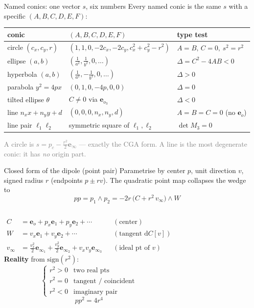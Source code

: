 \documentclass[aspectratio=169, 10pt]{beamer}
\newcommand{\eo}{\mathbf{e}_o}
\newcommand{\einff}{\mathbf{e}_\infty}
\newcommand{\eoi}[1]{\mathbf{e}_{o_{#1}}}
\newcommand{\einfi}[1]{\mathbf{e}_{\infty_{#1}}}
\newcommand{\wed}{\wedge}
\newcommand{\vinf}{v_\infty}
\newcommand{\pca}{p_c}
\begin{document}
\begin{frame}[t]{Named conics: one vector $s$, six numbers}
  Every named conic is the same $s$ with a specific $(A,B,C,D,E,F)$:
  \vspace{0.2cm}
  \begin{center}
  \renewcommand{\arraystretch}{1.3}
  \small
  \begin{tabular}{l l l}
    conic & $(A,B,C,D,E,F)$ & type test\\
    \hline
    \alert{circle} $(c_x,c_y,r)$ & $(1,1,0,-2c_x,-2c_y,c_x^2{+}c_y^2{-}r^2)$ & $A{=}B,\,C{=}0,\ s^2{=}r^2$\\
    \alert{ellipse} $(a,b)$ & $(\tfrac1{a^2},\tfrac1{b^2},0,\dots)$ & $\Delta=C^2{-}4AB<0$\\
    \alert{hyperbola} $(a,b)$ & $(\tfrac1{a^2},-\tfrac1{b^2},0,\dots)$ & $\Delta>0$\\
    \alert{parabola} $y^2{=}4px$ & $(0,1,0,-4p,0,0)$ & $\Delta=0$\\
    \alert{tilted ellipse} $\theta$ & $C\neq0$ via $\eoi3$ & $\Delta<0$\\
    \alert{line} $n_xx{+}n_yy{+}d$ & $(0,0,0,n_x,n_y,d)$ & $A{=}B{=}C{=}0$ (no $\eo$)\\
    \alert{line pair} $\ell_1\ell_2$ & symmetric square of $\ell_1,\ell_2$ & $\det M_3=0$\\
  \end{tabular}
  \end{center}
  \vspace{0.2cm}
  \textcolor{gray}{A circle is $s=\pca-\tfrac{r^2}2\einff$ --- exactly the CGA form. A line is the most degenerate conic: it has \emph{no} origin part.}
\end{frame}

\begin{frame}[t]{Closed form of the dipole (point pair)}
  Parametrise by center $p$, unit direction $v$, signed radius $r$
  (endpoints $p\pm r v$). The quadratic point map collapses the wedge to
  \[
    \boxed{\;
      pp = p_1\wed p_2 = -2r\,\big(C + r^2\,\vinf\big)\wed W
    \;}
  \]
  \vspace{-0.2cm}
  \begin{columns}[T]
      \small
      \begin{align*}
        C       &= \eo + p_x\mathbf{e}_1 + p_y\mathbf{e}_2 + \cdots && (\text{center})\\
        W       &= v_x\mathbf{e}_1 + v_y\mathbf{e}_2 + \cdots && (\text{tangent }\mathrm dC[v])\\
        \vinf   &= \tfrac{v_x^2}2\einfi1+\tfrac{v_y^2}2\einfi2+v_xv_y\einfi3 && (\text{ideal pt of }v)
      \end{align*}
      \textbf{Reality} from $\mathrm{sign}(r^2)$:
      \[
        \begin{cases}
          r^2>0 & \text{two real pts}\\
          r^2=0 & \text{tangent / coincident}\\
          r^2<0 & \text{imaginary pair}
        \end{cases}
      \]
      \[ pp^2 = 4r^4 \]
  \end{columns}
\end{frame}
\end{document}

